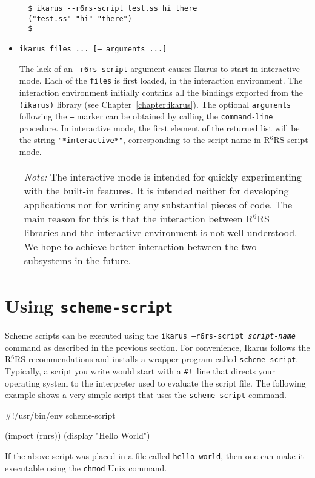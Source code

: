 \documentclass[onecolumn, 12pt, twoside, openright, dvipdfm]{book}
\newcommand{\rnrs}[1]{R$^{\mathrm{#1}}$RS}
\newcommand{\BoxedText}[2]{
  \vspace{.05in}
  \begin{center}
    \begin{tabular}{|p{4.6in}|} {\large \emph{#1}} #2 \end{tabular}
  \end{center}
  \vspace{.05in}
}
\begin{document}
\begin{itemize}
\begin{verbatim}
  $ ikarus --r6rs-script test.ss hi there
  ("test.ss" "hi" "there")
  $
\end{verbatim}

\item \texttt{ikarus files ... [-- arguments ...]}

The lack of an \texttt{--r6rs-script} argument causes Ikarus to
start in interactive mode.  Each of the \texttt{files} is first
loaded, in the interaction environment.  The interaction environment
initially contains all the bindings exported from the
\texttt{(ikarus)} library (see Chapter~\ref{chapter:ikarus}).  The
optional \texttt{arguments} following the \texttt{--} marker can be
obtained by calling the \texttt{command-line} procedure.  In
interactive mode, the first element of the returned list will be the
string \texttt{"*interactive*"}, corresponding to the script name in
\rnrs{6}-script mode.


\BoxedText{Note:}{The interactive mode is intended for quickly
experimenting with the built-in features.  It is intended neither
for developing applications nor for writing any substantial pieces
of code.  The main reason for this is that the interaction between
\rnrs{6} libraries and the interactive environment is not well
understood.  We hope to achieve better interaction between the two
subsystems in the future.}

\end{itemize}

\section{Using \texttt{scheme-script}}

Scheme scripts can be executed using the
\texttt{ikarus~--r6rs-script~\textit{script-name}} command as
described in the previous section.  For convenience, Ikarus
follows the \rnrs{6} recommendations and installs a wrapper program
called \texttt{scheme-script}.  Typically, a script you write would
start with a \texttt{\#!}\ line that directs your operating system
to the interpreter used to evaluate the script file.  The following
example shows a very simple script that uses the
\texttt{scheme-script} command.

\begin{CodeInline}
#!/usr/bin/env scheme-script

(import (rnrs))
(display "Hello World\n")
\end{CodeInline}

If the above script was placed in a file called
\texttt{hello-world}, then one can make it executable using the
\texttt{chmod} Unix command.
\end{document}
